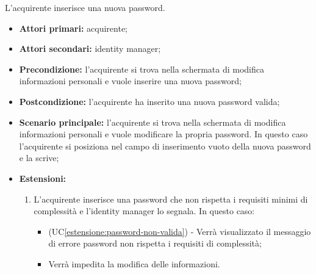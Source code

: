 L'acquirente inserisce una nuova password.
\begin{itemize}
    \item \textbf{Attori primari:} acquirente;
    \item \textbf{Attori secondari:} identity manager;
    \item \textbf{Precondizione:} l'acquirente si trova nella schermata di modifica informazioni personali e vuole inserire una nuova password;
    \item \textbf{Postcondizione:} l'acquirente ha inserito una nuova password valida;
    \item \textbf{Scenario principale:} l'acquirente si trova nella schermata di modifica informazioni personali e vuole modificare la propria password. In questo caso l'acquirente si posiziona nel campo di inserimento vuoto della nuova password e la scrive;
    \item \textbf{Estensioni:}
    \begin{enumerate}[label=\lett]
        \item L'acquirente inserisce una password che non rispetta i requisiti minimi di complessità e l'identity manager lo segnala. In questo caso:
        \begin{itemize}
            \item (UC\ref{estensione:password-non-valida}) - Verrà visualizzato il messaggio di errore password non rispetta i requisiti di complessità;
            \item Verrà impedita la modifica delle informazioni.
        \end{itemize}
    \end{enumerate}
\end{itemize}

\label{modifica-informazioni-acquirente.password.conferma-nuova-password}

